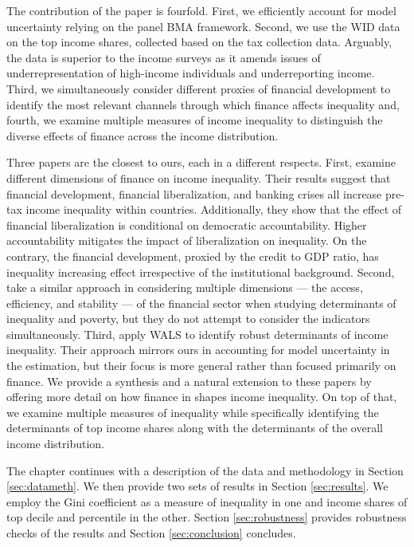 \documentclass[preprint, nonatbib, 10pt]{elsarticle}
\begin{document}
The contribution of the paper is fourfold. First, we efficiently account for model uncertainty relying on the panel \ac{BMA} framework. Second, we use the \ac{WID} data on the top income shares, collected based on the tax collection data. Arguably, the data is superior to the income surveys as it amends issues of underrepresentation of high-income individuals and underreporting income. Third, we simultaneously consider different proxies of financial development to identify the most relevant channels through which finance affects inequality and, fourth, we examine multiple measures of income inequality to distinguish the diverse effects of finance across the income distribution. 

Three papers are the closest to ours, each in a different respects. First, \textcite{de2017finance} examine different dimensions of finance on income inequality. Their results suggest that financial development, financial liberalization, and banking crises all increase pre-tax income inequality within countries. Additionally, they show that the effect of financial liberalization is conditional on democratic accountability. Higher accountability mitigates the impact of liberalization on inequality. On the contrary, the financial development, proxied by the credit to GDP ratio, has inequality increasing effect irrespective of the institutional background. Second, \textcite{naceurzhang2016} take a similar approach in considering multiple dimensions --- the access, efficiency, and stability --- of the financial sector when studying determinants of inequality and poverty, but they do not attempt to consider the indicators simultaneously.  Third, \textcite{furceri2019robust} apply \ac{WALS} to identify robust determinants of income inequality. Their approach mirrors ours in accounting for model uncertainty in the estimation, but their focus is more general rather than focused primarily on finance. We provide a synthesis and a natural extension to these papers by offering more detail on how finance in shapes income inequality. On top of that, we examine multiple measures of inequality while specifically identifying the determinants of top income shares along with the determinants of the overall income distribution.

The chapter continues with a description of the data and methodology in Section \ref{sec:datameth}. We then provide two sets of results in Section \ref{sec:results}. We employ the Gini coefficient as a measure of inequality in one and income shares of top decile and percentile in the other. Section \ref{sec:robustness} provides robustness checks of the results and Section \ref{sec:conclusion} concludes.
\end{document}
